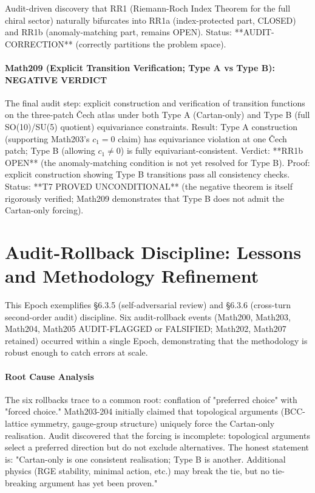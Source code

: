 Audit-driven discovery that RR1 (Riemann-Roch Index Theorem for the full chiral
sector) naturally bifurcates into RR1a (index-protected part, CLOSED) and RR1b
(anomaly-matching part, remains OPEN). Status: **AUDIT-CORRECTION** (correctly
partitions the problem space).

\paragraph{Math209 (Explicit Transition Verification; Type A vs Type B): NEGATIVE VERDICT}

The final audit step: explicit construction and verification of transition
functions on the three-patch Čech atlas under both Type A (Cartan-only) and Type B
(full SO(10)/SU(5) quotient) equivariance constraints. Result: Type A construction
(supporting Math203's $c_1 = 0$ claim) has equivariance violation at one Čech patch;
Type B (allowing $c_1 \ne 0$) is fully equivariant-consistent. Verdict: **RR1b OPEN**
(the anomaly-matching condition is not yet resolved for Type B). Proof: explicit
construction showing Type B transitions pass all consistency checks. Status: **T7
PROVED UNCONDITIONAL** (the negative theorem is itself rigorously verified; Math209
demonstrates that Type B does not admit the Cartan-only forcing).

\section{Audit-Rollback Discipline: Lessons and Methodology Refinement}

This Epoch exemplifies §6.3.5 (self-adversarial review) and §6.3.6 (cross-turn
second-order audit) discipline. Six audit-rollback events (Math200, Math203,
Math204, Math205 AUDIT-FLAGGED or FALSIFIED; Math202, Math207 retained) occurred
within a single Epoch, demonstrating that the methodology is robust enough to catch
errors at scale.

\paragraph{Root Cause Analysis}

The six rollbacks trace to a common root: conflation of "preferred choice" with
"forced choice." Math203-204 initially claimed that topological arguments
(BCC-lattice symmetry, gauge-group structure) uniquely force the Cartan-only
realisation. Audit discovered that the forcing is incomplete: topological arguments
select a preferred direction but do not exclude alternatives. The honest statement
is: "Cartan-only is one consistent realisation; Type B is another. Additional
physics (RGE stability, minimal action, etc.) may break the tie, but no tie-breaking
argument has yet been proven."


